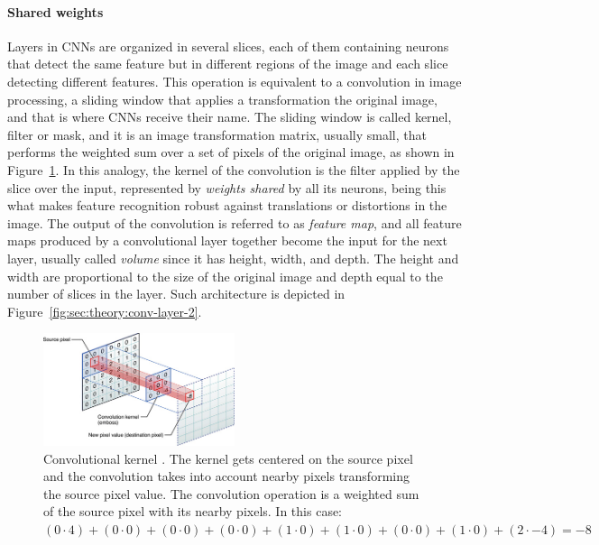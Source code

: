 \paragraph{Shared weights}
Layers in CNNs are organized in several slices, each of them containing neurons that detect the same feature but in different regions of the image and each slice detecting different features.
This operation is equivalent to a convolution in image processing, a sliding window that applies a transformation the original image, and that is where CNNs receive their name.
The sliding window is called kernel, filter or mask, and it is an image transformation matrix, usually small, that performs the weighted sum over a set of pixels of the original image, as shown in Figure~\ref{fig:sec:theory:covnets:kernel}.
In this analogy, the kernel of the convolution is the filter applied by the slice over the input, represented by \emph{weights shared} by all its neurons, being this what makes feature recognition robust against translations or distortions in the image.
The output of the convolution is referred to as \emph{feature map}, and all feature maps produced by a convolutional layer together become the input for the next layer, usually called \emph{volume} since it has height, width, and depth.
The height and width are proportional to the size of the original image and depth equal to the number of slices in the layer.
Such architecture is depicted in Figure~\ref{fig:sec:theory:conv-layer-2}.

\begin{figure}[htb]
  \begin{center}
    \includegraphics[width=0.5\textwidth]{gfx/kernel}
  \end{center}
  \caption{Convolutional kernel \cite{Apple}.
    The kernel gets centered on the source pixel and the convolution takes into account nearby pixels transforming the source pixel value.
    The convolution operation is a weighted sum of the source pixel with its nearby pixels. In this case:\\
    $(0\cdot4)+(0\cdot0)+(0\cdot0)
     +(0\cdot0)+(1\cdot0)+(1\cdot0)
     +(0\cdot0)+(1\cdot0)+(2\cdot-4) = -8$
  }
  \label{fig:sec:theory:covnets:kernel}
\end{figure}

